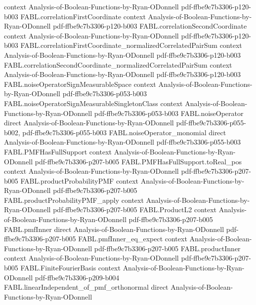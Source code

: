 \begin{theorem}
  {context}
  {Analysis-of-Boolean-Functions-by-Ryan-ODonnell}
  {pdf-ffbe9c7b3306-p120-b003}
\proofstep
  {FABL.correlationFirstCoordinate}
  {context}
  {Analysis-of-Boolean-Functions-by-Ryan-ODonnell}
  {pdf-ffbe9c7b3306-p120-b003}
\proofstep
  {FABL.correlationSecondCoordinate}
  {context}
  {Analysis-of-Boolean-Functions-by-Ryan-ODonnell}
  {pdf-ffbe9c7b3306-p120-b003}
\proofstep
  {FABL.correlationFirstCoordinate_normalizedCorrelatedPairSum}
  {context}
  {Analysis-of-Boolean-Functions-by-Ryan-ODonnell}
  {pdf-ffbe9c7b3306-p120-b003}
\proofstep
  {FABL.correlationSecondCoordinate_normalizedCorrelatedPairSum}
  {context}
  {Analysis-of-Boolean-Functions-by-Ryan-ODonnell}
  {pdf-ffbe9c7b3306-p120-b003}
\proofstep
  {FABL.noiseOperatorSignMeasurableSpace}
  {context}
  {Analysis-of-Boolean-Functions-by-Ryan-ODonnell}
  {pdf-ffbe9c7b3306-p053-b003}
\proofstep
  {FABL.noiseOperatorSignMeasurableSingletonClass}
  {context}
  {Analysis-of-Boolean-Functions-by-Ryan-ODonnell}
  {pdf-ffbe9c7b3306-p053-b003}
\proofstep
  {FABL.noiseOperator}
  {direct}
  {Analysis-of-Boolean-Functions-by-Ryan-ODonnell}
  {pdf-ffbe9c7b3306-p055-b002,
    pdf-ffbe9c7b3306-p055-b003}
\proofstep
  {FABL.noiseOperator_monomial}
  {direct}
  {Analysis-of-Boolean-Functions-by-Ryan-ODonnell}
  {pdf-ffbe9c7b3306-p055-b003}
\proofstep
  {FABL.PMFHasFullSupport}
  {context}
  {Analysis-of-Boolean-Functions-by-Ryan-ODonnell}
  {pdf-ffbe9c7b3306-p207-b005}
\proofstep
  {FABL.PMFHasFullSupport.toReal_pos}
  {context}
  {Analysis-of-Boolean-Functions-by-Ryan-ODonnell}
  {pdf-ffbe9c7b3306-p207-b005}
\proofstep
  {FABL.productProbabilityPMF}
  {context}
  {Analysis-of-Boolean-Functions-by-Ryan-ODonnell}
  {pdf-ffbe9c7b3306-p207-b005}
\proofstep
  {FABL.productProbabilityPMF_apply}
  {context}
  {Analysis-of-Boolean-Functions-by-Ryan-ODonnell}
  {pdf-ffbe9c7b3306-p207-b005}
\proofstep
  {FABL.ProductL2}
  {context}
  {Analysis-of-Boolean-Functions-by-Ryan-ODonnell}
  {pdf-ffbe9c7b3306-p207-b005}
\proofstep
  {FABL.pmfInner}
  {direct}
  {Analysis-of-Boolean-Functions-by-Ryan-ODonnell}
  {pdf-ffbe9c7b3306-p207-b005}
\proofstep
  {FABL.pmfInner_eq_expect}
  {context}
  {Analysis-of-Boolean-Functions-by-Ryan-ODonnell}
  {pdf-ffbe9c7b3306-p207-b005}
\proofstep
  {FABL.productInner}
  {context}
  {Analysis-of-Boolean-Functions-by-Ryan-ODonnell}
  {pdf-ffbe9c7b3306-p207-b005}
\proofstep
  {FABL.FiniteFourierBasis}
  {context}
  {Analysis-of-Boolean-Functions-by-Ryan-ODonnell}
  {pdf-ffbe9c7b3306-p209-b004}
\proofstep
  {FABL.linearIndependent_of_pmf_orthonormal}
  {direct}
  {Analysis-of-Boolean-Functions-by-Ryan-ODonnell}

\end{theorem}
